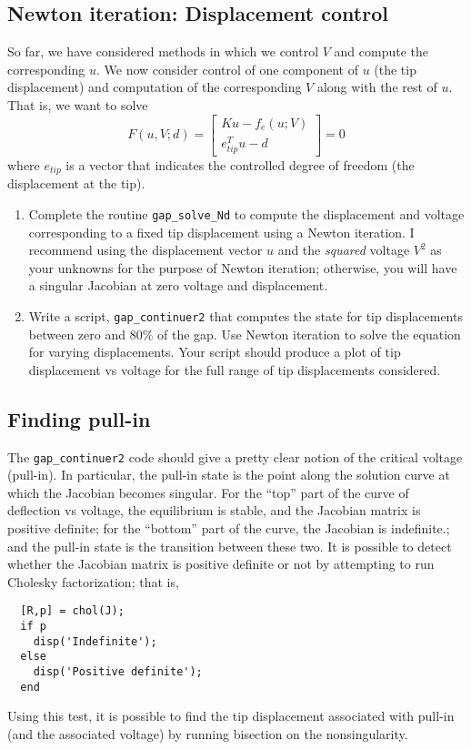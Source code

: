 \documentclass[12pt, leqno]{article} %
\begin{document}
\subsection{Newton iteration: Displacement control}

So far, we have considered methods in which we control $V$ and compute
the corresponding $u$.  We now consider control of one component of
$u$ (the tip displacement) and computation of the corresponding $V$
along with the rest of $u$.  That is, we want to solve
\[
F(u,V; d) =
\begin{bmatrix} Ku-f_e(u; V) \\ e_{tip}^T u - d \end{bmatrix} = 0
\]
where $e_{tip}$ is a vector that indicates the controlled degree of
freedom (the displacement at the tip).
\begin{enumerate}
\item Complete the routine {\tt gap\_solve\_Nd} to compute the
  displacement and voltage corresponding to a fixed tip displacement
  using a Newton iteration.  I recommend using the displacement
  vector $u$ and the {\em squared} voltage $V^2$ as your unknowns
  for the purpose of Newton iteration; otherwise, you will have a
  singular Jacobian at zero voltage and displacement.

\item Write a script, {\tt gap\_continuer2} that computes the state
  for tip displacements between zero and $80\%$ of the gap.  Use
  Newton iteration to solve the equation for varying displacements.
  Your script should produce a plot of tip displacement vs voltage
  for the full range of tip displacements considered.
  
\end{enumerate}

\subsection{Finding pull-in}

The {\tt gap\_continuer2} code should give a pretty clear notion of
the critical voltage (pull-in).  In particular, the pull-in state
is the point along the solution curve at which the Jacobian becomes
singular.  For the ``top'' part of the curve of deflection vs voltage,
the equilibrium is stable, and the Jacobian matrix is positive
definite; for the ``bottom'' part of the curve, the Jacobian is
indefinite.; and the pull-in state is the transition between these
two.  It is possible to detect whether the Jacobian matrix is positive
definite or not by attempting to run Cholesky factorization; that is,
\begin{lstlisting}
  [R,p] = chol(J);
  if p
    disp('Indefinite');
  else
    disp('Positive definite');
  end
\end{lstlisting}
Using this test, it is possible to find the tip displacement associated
with pull-in (and the associated voltage) by running bisection on the
nonsingularity.
\end{document}
